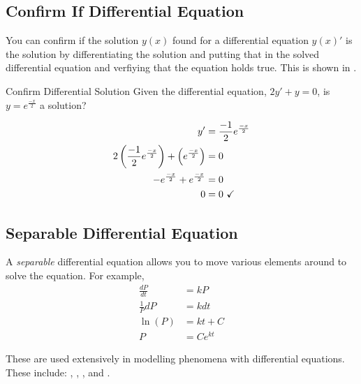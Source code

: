 	\subsection{Confirm If Differential Equation} \label{subsec:Confirm Differential Equation}
	You can confirm if the solution $y \left( x \right)$ found for a differential equation $y \left( x \right)'$ is the solution by differentiating the solution and putting that in the solved differential equation and verfiying that the equation holds true.
	This is shown in .
	\begin{example}[]{Confirm Differential Solution}
          Given the differential equation, $2y' + y = 0$, is $y = e^{\frac{-x}{2}}$ a solution? \newline

          \tcblower
          
          \begin{align*}
            y' &= \frac{-1}{2} e^{\frac{-x}{2}} \\
            2 \left( \frac{-1}{2} e^{\frac{-x}{2}} \right) + \left( e^{\frac{-x}{2}} \right) &= 0 \\
            -e^{\frac{-x}{2}} + e^{\frac{-x}{2}} &= 0 \\
            0 &= 0 \text{ \checkmark}
          \end{align*}
	\end{example}
		
	\subsection{Separable Differential Equation} \label{subsec:Separable Differential Equation}
		\begin{definition}[Separable] \label{def:Separable}
			A \emph{separable} differential equation allows you to move various elements around to solve the equation.
			For example,
			\begin{align*}
				\frac{dP}{dt} &= kP \\
				\frac{1}{P} dP &= k dt \\
				\ln \left( P \right) &= kt + C \\
				P &= Ce^{kt}
			\end{align*}
			\begin{remark}
				These are used extensively in modelling phenomena with differential equations.
				These include: , , , and .
			\end{remark}
		\end{definition}
		

